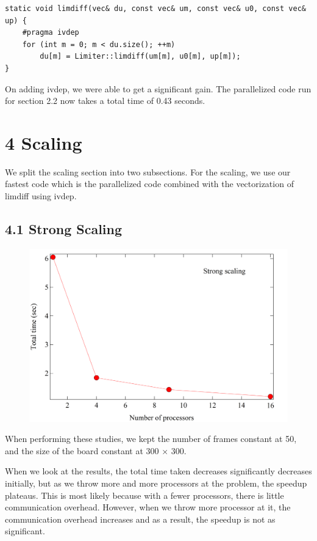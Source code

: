 \documentclass[11pt]{article}
\begin{document}
        \begin{lstlisting}
static void limdiff(vec& du, const vec& um, const vec& u0, const vec& up) {
    #pragma ivdep
    for (int m = 0; m < du.size(); ++m)
        du[m] = Limiter::limdiff(um[m], u0[m], up[m]);
}
        \end{lstlisting}
        On adding ivdep, we were able to get a significant gain. The parallelized code run for section 2.2 now takes a total time of 0.43 seconds. 
   
    \section{4 Scaling}
        We split the scaling section into two subsections. For the scaling, we use our fastest code which is the parallelized code combined with the vectorization of limdiff using ivdep.
             
    \subsection{4.1 Strong Scaling}
        \begin{figure}[H]
            \centering
            \includegraphics[width=5in]{strong.png}
        \end{figure}

        When performing these studies, we kept the number of frames constant at 50, and the size of the board constant at 300 $\times$ 300.

        When we look at the results, the total time taken decreases significantly decreases initially, but as we throw more and more processors at the problem, the speedup plateaus. This is most likely because with a fewer processors, there is little communication overhead. However, when we throw more processor at it, the communication overhead increases and as a result, the speedup is not as significant.
\end{document}
